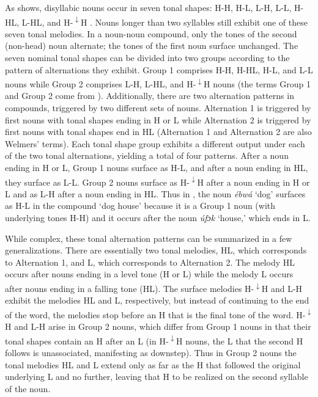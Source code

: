 \documentclass[output=paper]{langscibook}
\begin{document}


As  shows, disyllabic nouns occur in seven tonal shapes: H-H, H-L, L-H, L-L, H-HL, L-HL, and H-\textsuperscript{$\downarrow$}H \citep[86]{Welmers1968}. Nouns longer than two syllables still exhibit one of these seven tonal melodies. In a noun-noun compound, only the tones of the second (non-head) noun alternate; the tones of the first noun surface unchanged. The seven nominal tonal shapes can be divided into two groups according to the pattern of alternations they exhibit. Group 1 comprises H-H, H-HL, H-L, and L-L nouns while Group 2 comprises L-H, L-HL, and H-\textsuperscript{$\downarrow$}H nouns (the terms Group 1 and Group 2 come from \citealt{Welmers1968}). Additionally, there are two alternation patterns in compounds, triggered by two different sets of nouns. Alternation 1 is triggered by first nouns with tonal shapes ending in H or L while Alternation 2 is triggered by first nouns with tonal shapes end in HL (Alternation 1 and Alternation 2 are also Welmers’ terms). Each tonal shape group exhibits a different output under each of the two tonal alternations, yielding a total of four patterns. After a noun ending in H or L, Group 1 nouns surface as H-L, and after a noun ending in HL, they surface as L-L. Group 2 nouns surface as H-\textsuperscript{$\downarrow$}H after a noun ending in H or L and as L-H after a noun ending in HL. Thus in , the noun \textit{ébwá} ‘dog’ surfaces as H-L in the compound ‘dog house’ because it is a Group 1 noun (with underlying tones H-H) and it occurs after the noun \textit{úfɔk} ‘house,’ which ends in L.  

While complex, these tonal alternation patterns can be summarized in a few generalizations. There are essentially two tonal melodies, HL, which corresponds to Alternation 1, and L, which corresponds to Alternation 2. The melody HL occurs after nouns ending in a level tone (H or L) while the melody L occurs after nouns ending in a falling tone (HL). The surface melodies H-\textsuperscript{$\downarrow$}H and L-H exhibit the melodies HL and L, respectively, but instead of continuing to the end of the word, the melodies stop before an H that is the final tone of the word. H-\textsuperscript{$\downarrow$}H and L-H arise in Group 2 nouns, which differ from Group 1 nouns in that their tonal shapes contain an H after an L (in H-\textsuperscript{$\downarrow$}H nouns, the L that the second H follows is unassociated, manifesting as downstep). Thus in Group 2 nouns the tonal melodies HL and L extend only as far as the H that followed the original underlying L and no further, leaving that H to be realized on the second syllable of the noun. 
\end{document}
